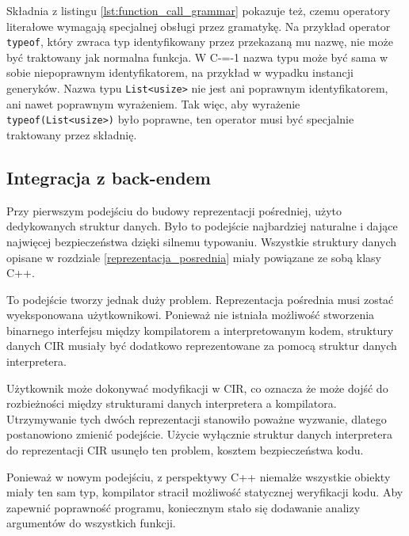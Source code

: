 Składnia z listingu \ref{lst:function_call_grammar} pokazuje też, czemu operatory literałowe wymagają specjalnej obsługi przez gramatykę.
Na przykład operator \lstinline{typeof}, który zwraca typ identyfikowany przez przekazaną mu nazwę, nie może być traktowany jak normalna funkcja.
W C-=-1 nazwa typu może być sama w sobie niepoprawnym identyfikatorem, na przykład w wypadku instancji generyków.
Nazwa typu \lstinline{List<usize>} nie jest ani poprawnym identyfikatorem, ani nawet poprawnym wyrażeniem.
Tak więc, aby wyrażenie \lstinline{typeof(List<usize>)} było poprawne, ten operator musi być specjalnie traktowany przez składnię.

\subsection{Integracja z back-endem}
\label{backend_integration}
Przy pierwszym podejściu do budowy reprezentacji pośredniej, użyto dedykowanych struktur danych. Było to podejście najbardziej naturalne i dające najwięcej bezpieczeństwa dzięki silnemu typowaniu. Wszystkie struktury danych opisane w rozdziale \ref{reprezentacja_posrednia} miały powiązane ze sobą klasy C++.


To podejście tworzy jednak duży problem. Reprezentacja pośrednia musi zostać wyeksponowana użytkownikowi. Ponieważ nie istniała możliwość stworzenia binarnego interfejsu między kompilatorem a interpretowanym kodem, struktury danych CIR musiały być dodatkowo reprezentowane za pomocą struktur danych interpretera.


Użytkownik może dokonywać modyfikacji w CIR, co oznacza że może dojść do rozbieżności między strukturami danych interpretera a kompilatora. Utrzymywanie tych dwóch reprezentacji stanowiło poważne wyzwanie, dlatego postanowiono zmienić podejście. Użycie wyłącznie struktur danych interpretera do reprezentacji CIR usunęło ten problem, kosztem bezpieczeństwa kodu.


Ponieważ w nowym podejściu, z perspektywy C++ niemalże wszystkie obiekty miały ten sam typ, kompilator stracił możliwość statycznej weryfikacji kodu.
Aby zapewnić poprawność programu, koniecznym stało się dodawanie analizy argumentów do wszystkich funkcji.
